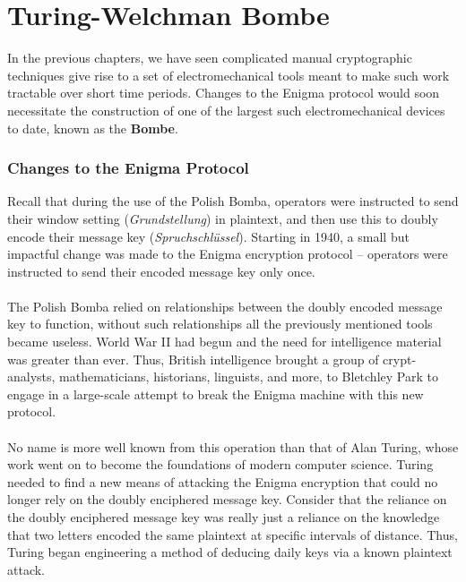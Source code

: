 

\chapter{Turing-Welchman Bombe}

In the previous chapters, we have seen complicated manual cryptographic techniques give rise to a set of electromechanical tools meant to make such work tractable over short time periods. Changes to the Enigma protocol would soon necessitate the construction of one of the largest such electromechanical devices to date, known as the {\bf{Bombe}}.

\subsection{Changes to the Enigma Protocol}
Recall that during the use of the Polish Bomba, operators were instructed to send their window setting (\emph{Grundstellung}) in plaintext, and then use this to doubly encode their message key (\emph{Spruchschlüssel}). Starting in 1940, a small but impactful change was made to the Enigma encryption protocol -- operators were instructed to send their encoded message key only once.
\\\\The Polish Bomba relied on relationships between the doubly encoded message key to function, without such relationships all the previously mentioned tools became useless. World War II had begun and the need for intelligence material was greater than ever. Thus, British intelligence brought a group of crypt-analysts, mathematicians, historians, linguists, and more, to Bletchley Park to engage in a large-scale attempt to break the Enigma machine with this new protocol.
\\\\No name is more well known from this operation than that of Alan Turing, whose work went on to become the foundations of modern computer science. Turing needed to find a new means of attacking the Enigma encryption that could no longer rely on the doubly enciphered message key. Consider that the reliance on the doubly enciphered message key was really just a reliance on the knowledge that two letters encoded the same plaintext at specific intervals of distance. Thus, Turing began engineering a method of deducing daily keys via a known plaintext attack.

